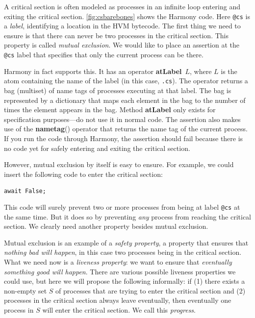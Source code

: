 \documentclass{report}
\newenvironment{code}{
\tcolorbox
}{
\endtcolorbox
}
\begin{document}
%

A critical section is often modeled as processes in an infinite loop
entering and exiting the critical section.
\autoref{fig:csbarebones} shows the Harmony code.
Here \texttt{@cs} is a \emph{label},
%
identifying a location in the HVM bytecode.  The first thing we need to
ensure is that there can never be two processes in the critical section.
This property is called \emph{mutual exclusion}.
%
We would like to place an assertion at the \texttt{@cs} label that
specifies that only the current process can be there.

Harmony in fact supports this.
It has an operator \textbf{atLabel}~$L$,
%
where $L$
is the atom containing the name of the label (in this case, \texttt{.cs}).
The operator returns a bag (multiset) of name tags of processes executing at that
label.  The bag is represented by a dictionary that maps each element
in the bag to the number of times the element appears in the bag.
Method \textbf{atLabel} only exists for specification purposes---do not
use it in normal code.
The assertion also makes use of the \textbf{nametag}() operator
%
that returns the name tag of the current process.
If you run the code through Harmony, the assertion should fail because
there is no code yet for safely entering and exiting the critical section.

However, mutual exclusion by itself is easy to ensure.
For example, we could insert the following code to enter the
critical section:
\begin{code}
\texttt{await False;}
\end{code}
This code will surely prevent two or more processes from being
at label \texttt{@cs} at the same time.
But it does so by preventing \emph{any} process from reaching
the critical section.
We clearly need another property besides mutual exclusion.

Mutual exclusion is an example of a \emph{safety property},
%
a property that ensures that \emph{nothing bad will happen}, in this case
two processes being in the critical section.
What we need now is a \emph{liveness property}:
%
we want to ensure that
\emph{eventually something good will happen}.
There are various possible liveness properties we could use,
but here we will propose the following informally: if
(1) there exists a non-empty
set $S$ of processes that are trying to enter the critical section and
(2) processes in the critical section always leave eventually, then
eventually one process in $S$ will enter the critical section.
We call this \emph{progress}.
%
\end{document}
